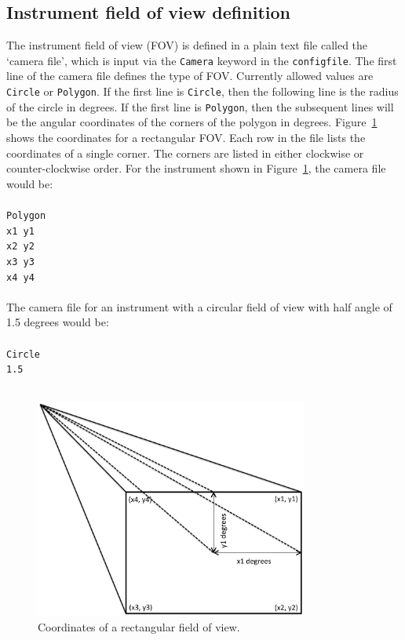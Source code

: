 \documentclass[10pt,a4paper]{article}
\begin{document}
\subsection{Instrument field of view definition}
\label{sec:fov}
The instrument field of view (FOV) is defined in a plain text file
called the `camera file', which is input via the \verb+Camera+ keyword
in the \verb+configfile+. The first line of the camera file defines
the type of FOV. Currently allowed values are \verb+Circle+ or
\verb+Polygon+.  If the first line is \verb+Circle+, then the
following line is the radius of the circle in degrees. If the first
line is \verb+Polygon+, then the subsequent lines will be the angular
coordinates of the corners of the polygon in degrees.
Figure~\ref{fig:instrument} shows the coordinates for a rectangular
FOV. Each row in the file lists the coordinates of a single
corner. The corners are listed in either clockwise or
counter-clockwise order. For the instrument shown in
Figure~\ref{fig:instrument}, the camera file would be:\\\\

\verb+Polygon+ \\
\verb+x1 y1+ \\
\verb+x2 y2+ \\
\verb+x3 y3+ \\
\verb+x4 y4+ \\\\

The camera file for an instrument with a circular field of view with
half angle of 1.5 degrees would be:\\\\

\verb+Circle+\\
\verb+1.5+\\\\

\begin{figure}
  \includegraphics[width=0.8\textwidth]{InstrumentFOV}
  \caption{Coordinates of a rectangular field of view.}
  \label{fig:instrument}
\end{figure}
\end{document}
